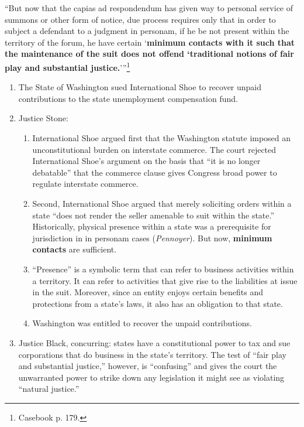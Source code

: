 \enquote{But now that the capias ad respondendum has given way to personal 
service of summons or other form of notice, due process requires only that in 
order to subject a defendant to a judgment in personam, if he be not present 
within the territory of the forum, he have certain \enquote{\textbf{minimum 
contacts with it such that the maintenance of the suit does not offend 
`traditional notions of fair play and substantial 
justice.}}}\footnote{Casebook p. 179.}
\begin{enumerate}
    \item The State of Washington sued International Shoe to recover unpaid 
    contributions to the state unemployment compensation fund.
    \item Justice Stone:
    \begin{enumerate}
        \item International Shoe argued first that the Washington statute 
        imposed an unconstitutional burden on interstate commerce. The court 
        rejected International Shoe's argument on the basis that ``it is no 
        longer debatable'' that the commerce clause gives Congress broad power 
        to regulate interstate commerce.
        \item Second, International Shoe argued that merely soliciting orders 
        within a state ``does not render the seller amenable to suit within 
        the state.'' Historically, physical presence within a state was a 
        prerequisite for jurisdiction in in personam cases (\emph{Pennoyer}). 
        But now, \textbf{minimum contacts} are sufficient.
        \item ``Presence'' is a symbolic term that can refer to business 
        activities within a territory.  It can refer to activities that give 
        rise to the liabilities at issue in the suit. Moreover, since an 
        entity enjoys certain benefits and protections from a state's laws, it 
        also has an obligation to that state.
        \item Washington was entitled to recover the unpaid contributions.
    \end{enumerate}
    \item Justice Black, concurring: states have a constitutional power to tax 
    and sue corporations that do business in the state's territory. The test 
    of ``fair play and substantial justice,'' however, is ``confusing'' and 
    gives the court the unwarranted power to strike down any legislation it 
    might see as violating ``natural justice.''
\end{enumerate}

